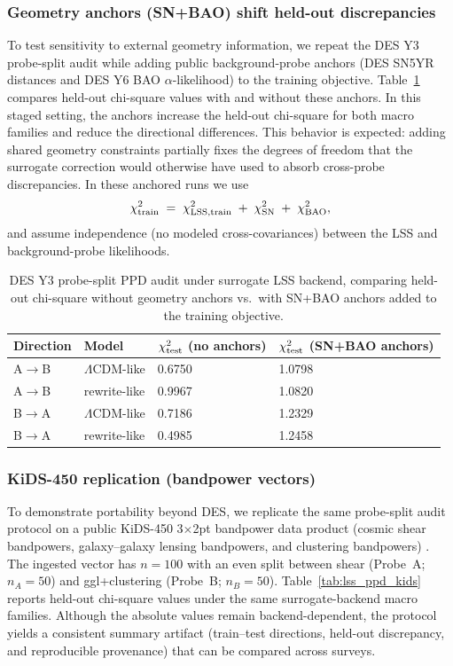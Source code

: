 \documentclass[11pt]{article}
\theoremstyle{definition}
\theoremstyle{plain}
\theoremstyle{remark}
\begin{document}
\subsubsection{Geometry anchors (SN+BAO) shift held-out discrepancies}\label{sec:results:lss_anchors}
To test sensitivity to external geometry information, we repeat the DES Y3 probe-split audit while adding public background-probe anchors (DES SN5YR distances and DES Y6 BAO $\alpha$-likelihood) to the training objective.
Table~\ref{tab:lss_ppd_y3_anchors} compares held-out chi-square values with and without these anchors.
In this staged setting, the anchors increase the held-out chi-square for both macro families and reduce the directional differences.
This behavior is expected: adding shared geometry constraints partially fixes the degrees of freedom that the surrogate correction would otherwise have used to absorb cross-probe discrepancies.
In these anchored runs we use
\[
\chi^2_{\rm train} \;=\; \chi^2_{\rm LSS,train} \;+\; \chi^2_{\rm SN} \;+\; \chi^2_{\rm BAO},
\]
and assume independence (no modeled cross-covariances) between the LSS and background-probe likelihoods.

\begin{table}[t]
\centering
\caption{DES Y3 probe-split PPD audit under surrogate LSS backend, comparing held-out chi-square without geometry anchors vs.\ with SN+BAO anchors added to the training objective.}
\label{tab:lss_ppd_y3_anchors}
\begin{tabular}{@{}llll@{}}
\toprule
Direction & Model & $\chi^2_{\rm test}$ (no anchors) & $\chi^2_{\rm test}$ (SN+BAO anchors) \\
\midrule
A$\to$B & $\Lambda$CDM-like & 0.6750 & 1.0798 \\
A$\to$B & rewrite-like & 0.9967 & 1.0820 \\
B$\to$A & $\Lambda$CDM-like & 0.7186 & 1.2329 \\
B$\to$A & rewrite-like & 0.4985 & 1.2458 \\
\bottomrule
\end{tabular}
\end{table}

\subsubsection{KiDS-450 replication (bandpower vectors)}\label{sec:results:lss_kids}
To demonstrate portability beyond DES, we replicate the same probe-split audit protocol on a public KiDS-450 3$\times$2pt bandpower data product (cosmic shear bandpowers, galaxy--galaxy lensing bandpowers, and clustering bandpowers) \cite{vanUitert2018KiDSGAMA,KiDSDataProducts}.
The ingested vector has $n=100$ with an even split between shear (Probe~A; $n_A=50$) and ggl+clustering (Probe~B; $n_B=50$).
Table~\ref{tab:lss_ppd_kids} reports held-out chi-square values under the same surrogate-backend macro families.
Although the absolute values remain backend-dependent, the protocol yields a consistent summary artifact (train--test directions, held-out discrepancy, and reproducible provenance) that can be compared across surveys.
\end{document}
